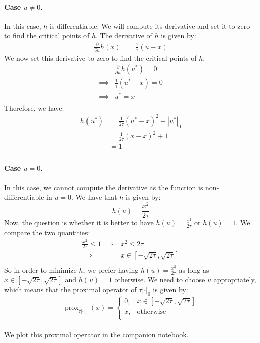 \documentclass[12pt]{article}
\newcommand{\prox}{\operatorname{prox}}
\begin{document}
\paragraph{Case $u \neq 0$.}
In this case, $h$ is differentiable. We will compute its derivative and set it to zero to find the critical points of $h$. The derivative of $h$ is given by:
\begin{align*}
  \frac{\partial}{\partial u} h(x)
   & = \frac{1}{\tau} (u-x)
\end{align*}
We now set this derivative to zero to find the critical points of $h$:
\begin{align*}
           &
  \frac{\partial}{\partial u}  h(u^*) = 0 \\
  \implies &
  \frac{1}{\tau} (u^*-x) = 0              \\
  \implies &
  u^* = x                                 \\
\end{align*}
Therefore, we have:
\begin{align*}
  h(u^*)
   & = \frac{1}{2\tau}\left(u^* - x \right)^2 + |u^*|_0 \\
   & = \frac{1}{2\tau}\left(x - x \right)^2 + 1         \\
   & = 1                                                \\
\end{align*}
\paragraph{Case $u = 0$.}
In this case, we cannot compute the derivative as the function is non-differentiable in $u = 0$. We have that $h$ is given by:
\begin{equation*}
  h(u) = \frac{x^2}{2\tau}
\end{equation*}
Now, the question is whether it is better to have $h(u) = \frac{x^2}{2\tau}$ or $h(u) = 1$. We compare the two quantities:
\begin{align*}
  \frac{x^2}{2\tau} \leq 1
  \implies &
  x^2 \leq 2\tau                         \\
  \implies &
  x \in [-\sqrt{2\tau}, \sqrt{2\tau}] \\
\end{align*}
So in order to minimize $h$, we prefer having $h(u) = \frac{x^2}{2\tau}$ as long as $x \in [-\sqrt{2\tau}, \sqrt{2\tau}]$ and $h(u) = 1$ otherwise. We need to choose $u$ appropriately, which means that the proximal operator of $\tau |\cdot|_0$ is given by:
\begin{equation*}
  \prox_{\tau |\cdot|_0}(x) = \begin{cases}
    0, & x \in [-\sqrt{2\tau}, \sqrt{2\tau}] \\
    x, & \text{otherwise}                    \\
  \end{cases}
\end{equation*}
\\We plot this proximal operator in the companion notebook.
\end{document}
